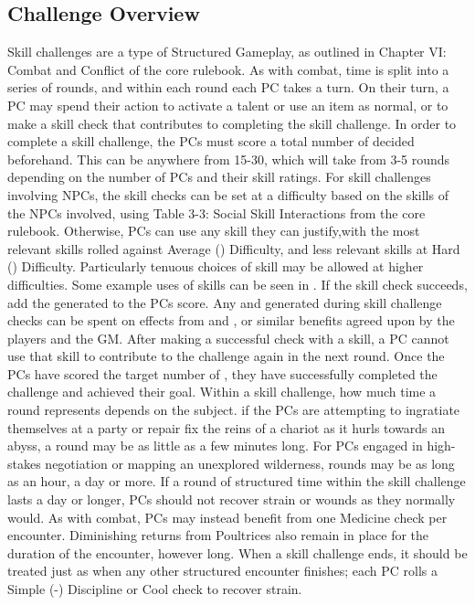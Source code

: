 \subsection{Challenge Overview}
Skill challenges are a type of Structured Gameplay, as outlined in Chapter VI: Combat and Conflict
of the core rulebook. As with combat, time is split into a series of rounds, and within each round
each PC takes a turn. On their turn, a PC may spend their action to activate a talent or use an item
as normal, or to make a skill check that contributes to completing the skill challenge. In order to
complete a skill challenge, the PCs must score a total number of \success decided beforehand. This
can be anywhere from 15-30, which will take from 3-5 rounds depending on the number of PCs and their
skill ratings. For skill challenges involving NPCs, the skill checks can be set at a difficulty based
on the skills of the NPCs involved, using Table 3-3: Social Skill Interactions from the core rulebook.
Otherwise, PCs can use any skill they can justify,with the most relevant skills rolled against
Average (\difficulty\difficulty) Difficulty, and less relevant skills at Hard (\difficulty\difficulty\difficulty) Difficulty.
Particularly tenuous choices of skill may be allowed at higher difficulties. Some example uses of skills
can be seen in . If the skill check succeeds, add the \success
generated to the PCs score. Any \advantage \triumph \threat and \despair generated during skill challenge
checks can be spent on effects from  and ,
or similar benefits agreed upon by the players and the GM. After making a successful check with a skill,
a PC cannot use that skill to contribute to the challenge again in the next round. Once the PCs have
scored the target number of \success, they have successfully completed the challenge and achieved their
goal. Within a skill challenge, how much time a round represents depends on the subject. if the PCs are
attempting to ingratiate themselves at a party or repair fix the reins of a chariot as it hurls towards
an abyss, a round may be as little as a few minutes long. For PCs engaged in high-stakes negotiation or
mapping an unexplored wilderness, rounds may be as long as an hour, a day or more. If a round of structured
time within the skill challenge lasts a day or longer, PCs should not recover strain or wounds as they
normally would. As with combat, PCs may instead benefit from one Medicine check per encounter. Diminishing
returns from Poultrices also remain in place for the duration of the encounter, however long. When a skill
challenge ends, it should be treated just as when any other structured encounter finishes; each PC rolls a
Simple (-) Discipline or Cool check to recover strain.


